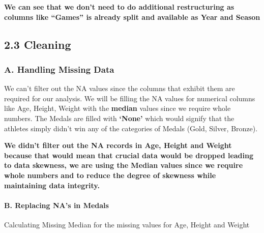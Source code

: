 \documentclass[
]{article}
\newenvironment{Shaded}{\begin{snugshade}}{\end{snugshade}}
\newcommand{\CommentTok}[1]{\textcolor[rgb]{0.56,0.35,0.01}{\textit{#1}}}
\newcommand{\FunctionTok}[1]{\textcolor[rgb]{0.00,0.00,0.00}{#1}}
\newcommand{\NormalTok}[1]{#1}
\newcommand{\OtherTok}[1]{\textcolor[rgb]{0.56,0.35,0.01}{#1}}
\newcommand{\SpecialCharTok}[1]{\textcolor[rgb]{0.00,0.00,0.00}{#1}}
\newcommand{\StringTok}[1]{\textcolor[rgb]{0.31,0.60,0.02}{#1}}
\begin{document}
\textbf{We can see that we don't need to do additional restructuring as
columns like ``Games'' is already split and available as Year and
Season}

\hypertarget{cleaning}{%
\subsection{2.3 Cleaning}\label{cleaning}}

\hypertarget{a.-handling-missing-data}{%
\subsubsection{A. Handling Missing
Data}\label{a.-handling-missing-data}}

We can't filter out the NA values since the columns that exhibit them
are required for our analysis. We will be filling the NA values for
numerical columns like Age, Height, Weight with the \textbf{median}
values since we require whole numbers. The Medals are filled with
\textbf{`None'} which would signify that the athletes simply didn't win
any of the categories of Medals (Gold, Silver, Bronze).

\textbf{We didn't filter out the NA records in Age, Height and Weight
because that would mean that crucial data would be dropped leading to
data skewness, we are using the Median values since we require whole
numbers and to reduce the degree of skewness while maintaining data
integrity.}

\hypertarget{b.-replacing-nas-in-medals}{%
\paragraph{B. Replacing NA's in
Medals}\label{b.-replacing-nas-in-medals}}

\begin{Shaded}
\end{Shaded}

Calculating Missing Median for the missing values for Age, Height and
Weight
\end{document}
